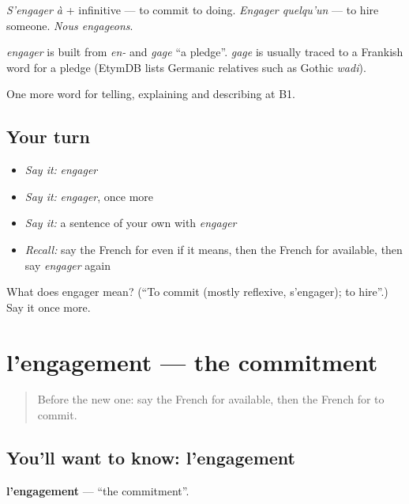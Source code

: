 \emph{S'engager à} + infinitive — to commit to doing. \emph{Engager quelqu'un} — to hire someone. \emph{Nous engageons}.

\begin{cousinweb}
\emph{engager} is built from \emph{en-} and \emph{gage} \textquotedblleft{}a pledge\textquotedblright{}. \emph{gage} is usually traced to a Frankish word for a pledge (EtymDB lists Germanic relatives such as Gothic \emph{wadi}).
\end{cousinweb}

\begin{grammarlens}[title={What you've built}]
One more word for telling, explaining and describing at B1.
\end{grammarlens}

\subsection*{Your turn}
\begin{itemize}
\raggedright
  \item \emph{Say it:} \emph{engager}
  \item \emph{Say it:} \emph{engager}, once more
  \item \emph{Say it:} a sentence of your own with \emph{engager}
  \item \emph{Recall:} say the French for even if it means, then the French for available, then say \emph{engager} again
\end{itemize}

\begin{tcolorbox}[breakable,colback=teal!4,colframe=teal!35!black,title={Before you move on}]
What does engager mean? (\textquotedblleft{}To commit (mostly reflexive, s'engager); to hire\textquotedblright{}.) Say it once more.
\end{tcolorbox}
\section[l'engagement]{l'engagement — the commitment}

\label{lesson:FR-C373-engagement}



\begin{quote}
Before the new one: say the French for available, then the French for to commit.
\end{quote}

\subsection*{You'll want to know: l'engagement}
\textbf{l'engagement} — \textquotedblleft{}the commitment\textquotedblright{}.

